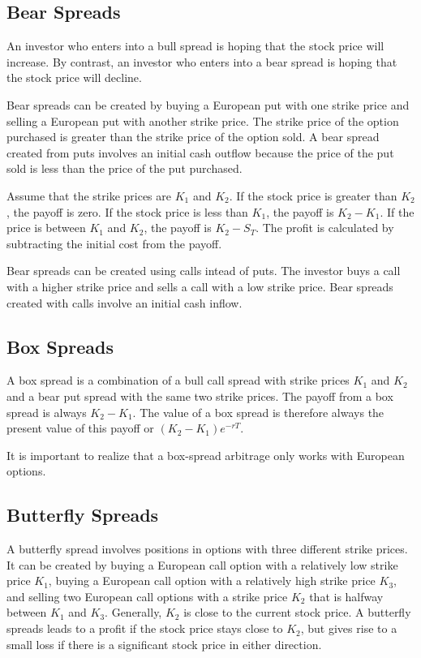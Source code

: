 \documentclass{article}
\begin{document}
\subsection{Bear Spreads}
An investor who enters into a bull spread is hoping that the stock price will increase. By contrast, an investor who enters into a bear spread is hoping that the stock price will decline.

Bear spreads can be created by buying a European put with one strike price and selling a European put with another strike price. The strike price of the option purchased is greater than the strike price of the option sold. A bear spread created from puts involves an initial cash outflow because the price of the put sold is less than the price of the put purchased.

Assume that the strike prices are $ K_1 $ and $ K_2 $. If the stock price is greater than $ K_2 $, the payoff is zero. If the stock price is less than $ K_1 $, the payoff is $ K_2-K_1 $. If the price is between  $ K_1 $ and $ K_2 $, the payoff is $ K_2-S_T $. The profit is calculated by subtracting the initial cost from the payoff.

Bear spreads can be created using calls intead of puts. The investor buys a call with a higher strike price and sells a call with a low strike price. Bear spreads created with calls involve an initial cash inflow.

\subsection{Box Spreads}
A box spread is a combination of a bull call spread with strike prices $ K_1 $ and $ K_2 $ and a bear put spread with the same two strike prices. The payoff from a box spread is always $ K_2-K_1 $. The value of a box spread is therefore always the present value of this payoff or $ (K_2-K_1)e^{-rT} $.

It is important to realize that a box-spread arbitrage only works with European options.

\subsection{Butterfly Spreads}
A butterfly spread involves positions in options with three different strike prices. It can be created by buying a European call option with a relatively low strike price $ K_1 $, buying a European call option with a relatively high strike price $ K_3 $, and selling two European call options with a strike price $ K_2 $ that is halfway between $ K_1 $ and $ K_3 $. Generally, $ K_2 $ is close to the current stock price. A butterfly spreads leads to a profit if the stock price stays close to $ K_2 $, but gives rise to a small loss if there is a significant stock price in either direction. 
\end{document}
